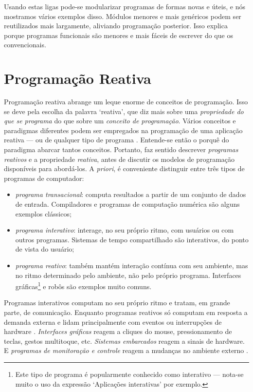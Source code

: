 \begin{citacao}
  Usando estas ligas pode-se modularizar programas de formas novas e úteis, e
  nós mostramos vários exemplos disso. Módulos menores e mais genéricos podem
  ser reutilizados mais largamente, aliviando programação posterior. Isso
  explica porque programas funcionais são menores e mais fáceis de escrever do
  que os convencionais. \cite[p.~22; tradução nossa]{hughes1990}
\end{citacao}
\section{Programação Reativa}
\label{sec:orgcf8c27c}
Programação reativa abrange um leque enorme de conceitos de programação.
Isso se deve pela escolha da palavra ‘reativa’, que diz mais sobre uma
\emph{propriedade do que se programa} do que sobre um \emph{conceito de programação}.
Vários conceitos e paradigmas diferentes podem ser empregados na programação
de uma aplicação reativa — ou de qualquer tipo de programa \cite{roy2009}.
Entende-se então o porquê do paradigma abarcar tantos conceitos.
Portanto, faz sentido descrever \emph{programas reativos} e a propriedade
\emph{reativa}, antes de discutir os modelos de programação disponíveis para
abordá-los.
A \emph{priori}, é conveniente distinguir entre três tipos de programas de
computador:

\begin{itemize}
\item \emph{programa transacional}: computa resultados a partir de um conjunto de dados
de entrada. Compiladores e programas de computação numérica são alguns
exemplos clássicos;
\item \emph{programa interativo}: interage, no seu próprio ritmo, com usuários ou com
outros programas. Sistemas de tempo compartilhado são interativos, do ponto
de vista do usuário;
\item \emph{programa reativo}: também mantém interação contínua com seu ambiente, mas
no ritmo determinado pelo ambiente, não pelo próprio programa. Interfaces
gráficas\footnote{Este tipo de programa é popularmente conhecido como interativo — nota-se muito o
uso da expressão ‘Aplicações interativas’ por exemplo.} e robôs são exemplos muito comuns.
\end{itemize}

Programas interativos computam no seu próprio ritmo e tratam, em grande parte,
de comunicação.
Enquanto programas reativos só computam em resposta a demanda externa e lidam
principalmente com eventos ou interrupções de hardware \cite{berry1989}.
\emph{Interfaces gráficas} reagem a cliques do mouse, pressionamento de teclas,
gestos multitoque, etc.
\emph{Sistemas embarcados} reagem a sinais de hardware.
E \emph{programas de monitoração e controle} reagem a mudanças no ambiente externo
\cite{salvaneschi2015}.

